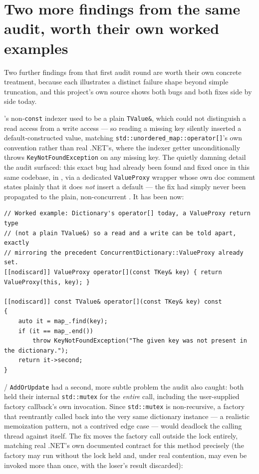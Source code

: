 \section{Two more findings from the same audit, worth their own worked examples}

Two further findings from that first audit round are worth their own concrete treatment,
because each illustrates a distinct failure shape beyond simple truncation, and this project's
own source shows both bugs and both fixes side by side today.

's non-\texttt{const} indexer used to be a plain
\texttt{TValue\&}, which could not distinguish a read access from a write access --- so reading
a missing key silently inserted a default-constructed value, matching
\texttt{std::unordered\_map::operator[]}'s own convention rather than real .NET's, where the
indexer getter unconditionally throws \texttt{KeyNotFoundException} on any missing key. The
quietly damning detail the audit surfaced: this exact bug had already been found and fixed once
in this same codebase, in , via a dedicated
\texttt{ValueProxy} wrapper whose own doc comment states plainly that it does \emph{not} insert
a default --- the fix had simply never been propagated to the plain, non-concurrent
. It has been now:

\begin{lstlisting}
// Worked example: Dictionary's operator[] today, a ValueProxy return type
// (not a plain TValue&) so a read and a write can be told apart, exactly
// mirroring the precedent ConcurrentDictionary::ValueProxy already set.
[[nodiscard]] ValueProxy operator[](const TKey& key) { return ValueProxy(this, key); }

[[nodiscard]] const TValue& operator[](const TKey& key) const
{
    auto it = map_.find(key);
    if (it == map_.end())
        throw KeyNotFoundException("The given key was not present in the dictionary.");
    return it->second;
}
\end{lstlisting}

 / \texttt{AddOrUpdate} had a second, more
subtle problem the audit also caught: both held their internal \texttt{std::mutex} for the
\emph{entire} call, including the user-supplied factory callback's own invocation. Since
\texttt{std::mutex} is non-recursive, a factory that reentrantly called back into the very same
dictionary instance --- a realistic memoization pattern, not a contrived edge case --- would
deadlock the calling thread against itself. The fix moves the factory call outside the lock
entirely, matching real .NET's own documented contract for this method precisely (the factory
may run without the lock held and, under real contention, may even be invoked more than once,
with the loser's result discarded):

